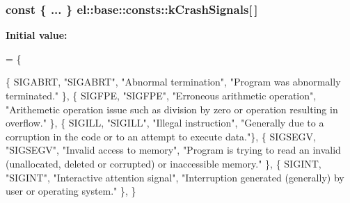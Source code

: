\subsubsection[{\texorpdfstring{k\+Crash\+Signals}{kCrashSignals}}]{\setlength{\rightskip}{0pt plus 5cm}const \{ ... \}   el\+::base\+::consts\+::k\+Crash\+Signals\mbox{[}$\,$\mbox{]}}\hypertarget{namespaceel_1_1base_1_1consts_a8b1cdab63e5f679bb7d1c2bac6b5e13c}{}\label{namespaceel_1_1base_1_1consts_a8b1cdab63e5f679bb7d1c2bac6b5e13c}
{\bfseries Initial value\+:}
\begin{DoxyCode}
= \{
                            
                            \{ SIGABRT, \textcolor{stringliteral}{"SIGABRT"}, \textcolor{stringliteral}{"Abnormal termination"},
                                \textcolor{stringliteral}{"Program was abnormally terminated."} \},
                            \{ SIGFPE, \textcolor{stringliteral}{"SIGFPE"}, \textcolor{stringliteral}{"Erroneous arithmetic operation"},
                                \textcolor{stringliteral}{"Arithemetic operation issue such as division by zero or operation
       resulting in overflow."} \},
                            \{ SIGILL, \textcolor{stringliteral}{"SIGILL"}, \textcolor{stringliteral}{"Illegal instruction"},
                                \textcolor{stringliteral}{"Generally due to a corruption in the code or to an attempt to execute
       data."}\},
                            \{ SIGSEGV, \textcolor{stringliteral}{"SIGSEGV"}, \textcolor{stringliteral}{"Invalid access to memory"},
                                \textcolor{stringliteral}{"Program is trying to read an invalid (unallocated, deleted or corrupted)
       or inaccessible memory."} \},
                            \{ SIGINT, \textcolor{stringliteral}{"SIGINT"}, \textcolor{stringliteral}{"Interactive attention signal"},
                                \textcolor{stringliteral}{"Interruption generated (generally) by user or operating system."} \},
                        \}
\end{DoxyCode}
